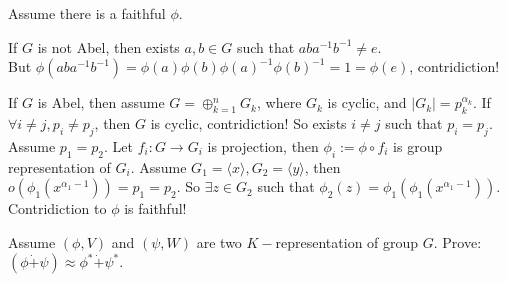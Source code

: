 \documentclass{ctexart}
\begin{document}
\begin{solution}
 Assume there is a faithful $\phi$. 
 
 If $G$ is not Abel, then exists $a,b\in G$ such that $aba^{-1}b^{-1}\neq e$. \\
 But $\phi(aba^{-1}b^{-1})=\phi(a)\phi(b)\phi(a)^{-1}\phi(b)^{-1}=1=\phi(e)$, contridiction! 

 If $G$ is Abel, then assume $G=\oplus_{k=1}^n G_k$, where $G_k$ is cyclic, and $|G_k|=p_k^{\alpha_k}$. If $\forall i\neq j, p_i\neq p_j$, then $G$ is cyclic, contridiction! So exists $i\neq j$ such that $p_i=p_j$. Assume $p_1= p_2$. Let $f_i:G\to G_i$ is projection, then $\phi_i:=\phi\circ f_i$ is group representation of $G_i$. Assume $G_1=\langle x\rangle,G_2=\langle y\rangle$, then $o(\phi_1(x^{\alpha_1-1}))=p_1=p_2$. So $\exists z\in G_2$ such that $\phi_2(z)=\phi_1(\phi_1(x^{\alpha_1-1}))$. Contridiction to $\phi$ is faithful! 
\end{solution}

\begin{problem}
 Assume $(\phi,V)$ and $(\psi,W)$ are two $K-$representation of group $G$. 
 Prove: $(\phi \dot{+}\psi)\approx \phi^*\dot{+}\psi^*$. 
\end{problem}

\begin{solution}
 
\end{solution}
\end{document}
